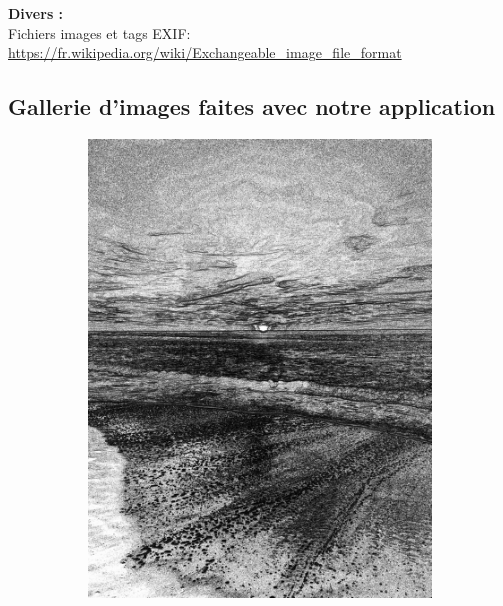 \documentclass[12pt, a4paper]{article}
\begin{document}
  \textbf{Divers :}
  \\
  Fichiers images et tags EXIF:
  \\
  \url{https://fr.wikipedia.org/wiki/Exchangeable_image_file_format}

  \subsection{Gallerie d'images faites avec notre application}
    \begin{figure}[!h]
      \centering 
      \begin{subfigure}[b]{0.3\textwidth}
          \includegraphics[width=1\textwidth]{report_src/art/depressing_sunset.jpeg}
      \end{subfigure}
      \begin{subfigure}[b]{0.3\textwidth}

\end{subfigure}
\end{figure}
\end{document}
